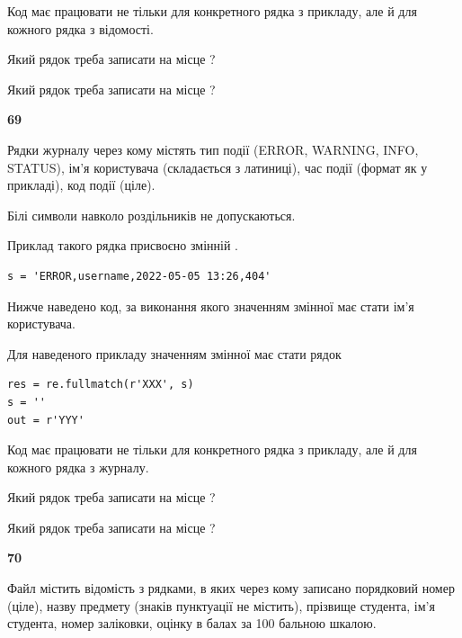 Код має працювати не тільки для конкретного рядка з прикладу, але й для кожного рядка з відомості.




Який рядок треба записати на місце  ?\par
\vspace{5mm}


Який рядок треба записати на місце  ?\par


\newpage

{\begin {center}\textbf{ 69}\end {center}}\par
Рядки журналу через кому містять тип події (ERROR, WARNING, INFO, STATUS), ім'я користувача (складається з латиниці), час події (фор\-мат як у прикладі), код події (ціле).

Білі символи навколо роздільників не допускаються.

Приклад такого рядка присвоєно змінній .



\begin{verbatim}
s = 'ERROR,username,2022-05-05 13:26,404'
\end{verbatim}


Нижче наведено код, за виконання якого значенням змінної  має стати ім'я користувача.

Для наведеного прикладу значенням змінної  має стати рядок 



\begin{verbatim}
res = re.fullmatch(r'XXX', s)
s = ''
out = r'YYY'
\end{verbatim}


Код має працювати не тільки для конкретного рядка з прикладу, але й для кожного рядка з журналу.




Який рядок треба записати на місце  ?\par
\vspace{5mm}


Який рядок треба записати на місце  ?\par


\newpage

{\begin {center}\textbf{ 70}\end {center}}\par
Файл  містить відомість з рядками, в яких через кому записано поряд\-ковий номер (ціле), назву предмету (знаків пунктуації не містить), прізвище студента, ім'я студента, номер заліковки, оцінку в балах за 100 бальною шкалою.

